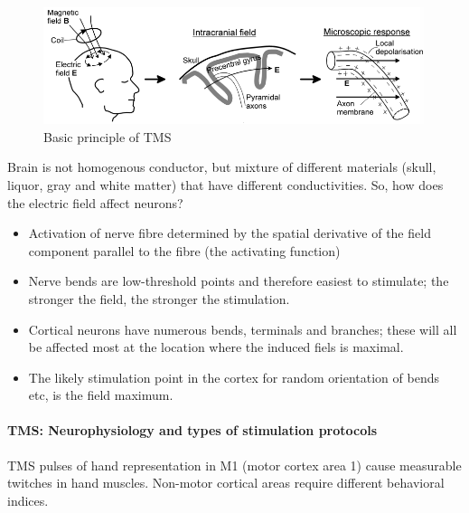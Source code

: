 \documentclass[12pt,article,oneside,a4paper]{memoir}
\begin{document}
\begin{figure}
  \centering
  \includegraphics[width=\textwidth]{imgs/tms.png}
  \caption{Basic principle of TMS}
  \label{fig:tms}
\end{figure}

Brain is not homogenous conductor, but mixture of different materials (skull, liquor,
gray and white matter) that have different conductivities. So, how does the electric field affect neurons?

\begin{itemize}
\item Activation of nerve fibre determined by the spatial derivative of the field component parallel to the fibre (the activating function)
\item Nerve bends are low-threshold points and therefore easiest to stimulate; the stronger the field, the stronger the stimulation.
\item Cortical neurons have numerous bends, terminals and branches; these will all be affected most at the location where the induced fiels is maximal.
\item The likely stimulation point in the cortex for random orientation of bends etc, is the field maximum.
\end{itemize}

\paragraph{TMS: Neurophysiology and types of stimulation protocols} TMS pulses of hand representation in M1 (motor cortex area 1) cause measurable twitches in hand muscles. Non-motor cortical areas require different behavioral indices.
\end{document}
